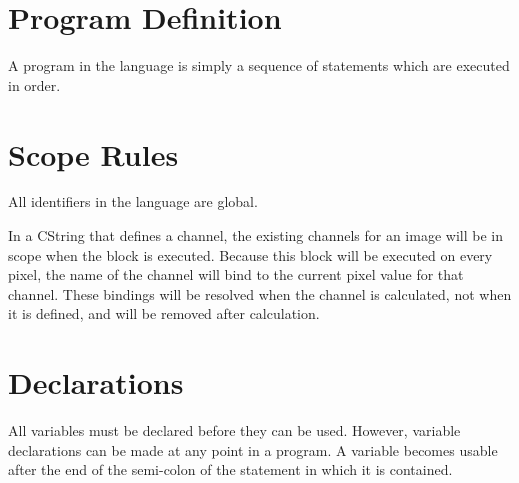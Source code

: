 \section{Program Definition}
A program in the \sys{} language is simply a sequence of statements which
are executed in order.

\section{Scope Rules}
All identifiers in the \sys{} language are global.

In a CString that defines a channel, the existing channels
for an image will be in scope when the block is executed. Because
this block will be executed on every pixel, the name of the channel
will bind to the current pixel value for that channel. These bindings
will be resolved when the channel is calculated, not when it is
defined, and will be removed after calculation.

\section{Declarations}
All variables must be declared before they can be used. However,
variable declarations can be made at any point in a program.
A variable becomes usable after the end of the semi-colon of the statement
in which it is contained.
